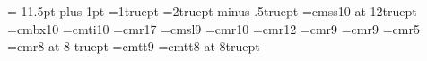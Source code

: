 %
%
\def\plainline#1{\hbox to \hsize{#1}}
\def\sin{\hbox{\rm sin}}
\def\cos{\hbox{\rm cos}}
\baselineskip = 11.5pt plus 1pt
\lineskiplimit=1truept
\lineskip=2truept minus .5truept
\newdimen\spread
\spread=2pt
\def\bestbreak{\par\penalty-9000}
\font\Lrm=cmss10 at 12truept 
\font\Lbf=cmbx10 %
\font\Lit=cmti10 %
\font\eighteenrm=cmr17 %
\font\slsmall=cmsl9 %
\font\tenrm=cmr10 %
\font\twelverm=cmr12 %
\font\rmsmall=cmr9
\font\ninerm=cmr9 
\font\fiverm=cmr5 
\font\eightrm=cmr8 at 8 truept
\font\ttexample=cmtt9
\font\tteight=cmtt8 at 8truept
\newfam\boldfam

\def\supereject{\newpage}




\def\bs{\char92}

\def\sloppy{\tolerance 2000 \hfuzz .5pt \vfuzz .5pt}
\def\fussy{\tolerance 200 \hfuzz .1pt \vfuzz .1pt}

\let\3=\ss
{}

\def\makeheadline{\vbox to 0pt{\vskip-.5truein
  \plainline{\vbox to 8.5pt{}\the\headline}\vss}\nointerlineskip}
\def\makefootline{\baselineskip=.5truein \plainline{\footline}} %
\def\noheadlines{\def\makeheadline{}
    \advance\voffset by -.5truein \advance\vsize by .5truein}
\def\nofootlines{\def\makefootline{}\advance\vsize by .5truein}

